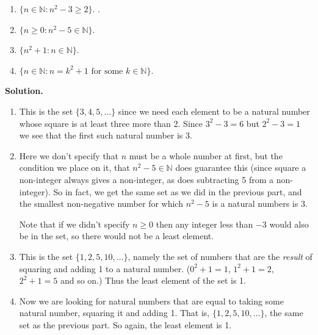 \documentclass[10pt,]{book}
\theoremstyle{plain}
\theoremstyle{definition}
\theoremstyle{definition}
\numberwithin{equation}{chapter}
\newcommand{\N}{\mathbb N}
\newcommand{\st}{:}
\begin{document}
\begin{exerciselist}
\hypertarget{p-461}{}%
\leavevmode%
\begin{enumerate}[label=(\alph*)]
\item\hypertarget{li-316}{}\hypertarget{p-462}{}%
\(\{n \in \N \st n^2 - 3 \ge 2\}\).   \framebox[4em]{\raisebox{1ex}{}}.%
\item\hypertarget{li-317}{}\hypertarget{p-463}{}%
\(\{n \ge 0 \st n^2 - 5 \in \N\}\).   \framebox[4em]{\raisebox{1ex}{}}%
\item\hypertarget{li-318}{}\hypertarget{p-464}{}%
\(\{n^2+1 \st n \in \N\}\).  \framebox[4em]{\raisebox{1ex}{}}%
\item\hypertarget{li-319}{}\hypertarget{p-465}{}%
\(\{n \in \N \st n = k^2 + 1 \text{ for some } k \in \N\}\).  \framebox[4em]{\raisebox{1ex}{}}%
\end{enumerate}
%
\par
\medskip\noindent%
\textbf{Solution.}\quad \hypertarget{p-466}{}%
\leavevmode%
\begin{enumerate}[label=(\alph*)]
\item\hypertarget{li-320}{}\hypertarget{p-467}{}%
This is the set \(\{3, 4, 5, \ldots \}\) since we need each element to be a natural number whose square is at least three more than 2.  Since \(3^2 - 3 = 6\) but \(2^2 - 3 = 1\) we see that the first such natural number is 3.%
\item\hypertarget{li-321}{}\hypertarget{p-468}{}%
Here we don't specify that \(n\) must be a whole number at first, but the condition we place on it, that \(n^2 - 5 \in \N\) does guarantee this (since square a non-integer always gives a non-integer, as does subtracting 5 from a non-integer).  So in fact, we get the same set as we did in the previous part, and the smallest non-negative number for which \(n^2 - 5\) is a natural numbers is 3.%
\par
\hypertarget{p-469}{}%
Note that if we didn't specify \(n \ge 0\) then any integer less than \(-3\) would also be in the set, so there would not be a least element.%
\item\hypertarget{li-322}{}\hypertarget{p-470}{}%
This is the set \(\{1, 2, 5, 10, \ldots\}\), namely the set of numbers that are the \emph{result} of squaring and adding 1 to a natural number.  (\(0^2 + 1 = 1\), \(1^2 + 1 = 2\), \(2^2 + 1 = 5\) and so on.)  Thus the least element of the set is 1.%
\item\hypertarget{li-323}{}\hypertarget{p-471}{}%
Now we are looking for natural numbers that are equal to taking some natural number, squaring it and adding 1.  That is, \(\{1, 2, 5, 10, \ldots\}\), the same set as the previous part.  So again, the least element is 1.%

\end{enumerate}
\end{exerciselist}
\end{document}
